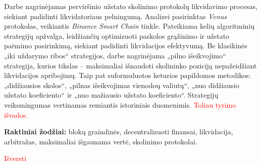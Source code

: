 \documentclass[]{VUMIFTemplateClass}
\begin{document}

\singlespacing


\tableofcontents

\onehalfspacing

Darbe nagrinėjamas perviršinio užstato skolinimo protokolų likvidavimo procesas, siekiant padidinti likvidatoriaus pelningumą. Analizei pasirinktas \textit{Venus} protokolas, veikiantis \textit{Binance Smart Chain} tinkle. Pateikiama kelių algoritminių strategijų apžvalga, leidžiančių optimizuoti paskolos grąžinimo ir užstato paėmimo pasirinkimą, siekiant padidinti likvidacijos efektyvumą. Be klasikinės „iki uždarymo ribos“ strategijos, darbe nagrinėjama „pilno išeikvojimo“ strategija, kurios tikslas – maksimaliai išnaudoti skolininko poziciją nepažeidžiant likvidacijos apribojimų. Taip pat suformuluotos keturios papildomos metodikos: „didžiausios skolos“, „pilnas išeikvojimas vienodoų valiutų“, „nuo didžiausio užstato koeficiento“ ir „nuo mažiausio užstato koeficiento“. Strategijų veiksmingumas vertinamas remiantis istoriniais duomenimis.
\textcolor{red}{Toliau tyrimo išvados.}


\noindent\textbf{Raktiniai žodžiai:} blokų graindinės, decentralizuoti finansai, likvidacija, arbitražas, maksimaliai išgaunama vertė, skolinimo protokolai.

\textcolor{red}{Išversti}
\end{document}
